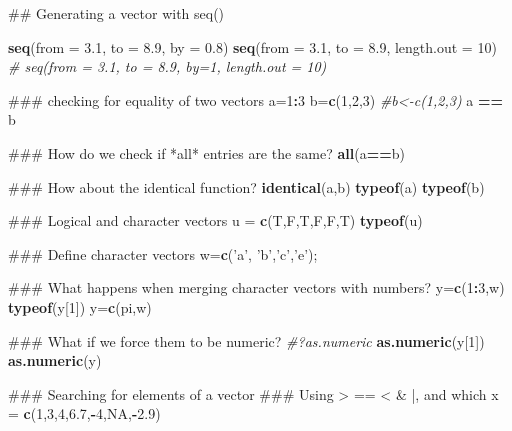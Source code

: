 \documentclass[12pt,]{book}
\newenvironment{Shaded}{\begin{snugshade}}{\end{snugshade}}
\newcommand{\KeywordTok}[1]{\textcolor[rgb]{0.13,0.29,0.53}{\textbf{#1}}}
\newcommand{\DataTypeTok}[1]{\textcolor[rgb]{0.13,0.29,0.53}{#1}}
\newcommand{\DecValTok}[1]{\textcolor[rgb]{0.00,0.00,0.81}{#1}}
\newcommand{\FloatTok}[1]{\textcolor[rgb]{0.00,0.00,0.81}{#1}}
\newcommand{\StringTok}[1]{\textcolor[rgb]{0.31,0.60,0.02}{#1}}
\newcommand{\CommentTok}[1]{\textcolor[rgb]{0.56,0.35,0.01}{\textit{#1}}}
\newcommand{\OtherTok}[1]{\textcolor[rgb]{0.56,0.35,0.01}{#1}}
\newcommand{\OperatorTok}[1]{\textcolor[rgb]{0.81,0.36,0.00}{\textbf{#1}}}
\newcommand{\NormalTok}[1]{#1}
\begin{document}
\begin{Shaded}
\begin{Highlighting}[]
\NormalTok{## Generating a vector with seq()}

\KeywordTok{seq}\NormalTok{(}\DataTypeTok{from =} \FloatTok{3.1}\NormalTok{, }\DataTypeTok{to =} \FloatTok{8.9}\NormalTok{, }\DataTypeTok{by =} \FloatTok{0.8}\NormalTok{)}
\KeywordTok{seq}\NormalTok{(}\DataTypeTok{from =} \FloatTok{3.1}\NormalTok{, }\DataTypeTok{to =} \FloatTok{8.9}\NormalTok{, }\DataTypeTok{length.out =} \DecValTok{10}\NormalTok{)}
\CommentTok{# seq(from = 3.1, to = 8.9, by=1, length.out = 10)}

\NormalTok{### checking for equality of two vectors}
\NormalTok{a=}\DecValTok{1}\OperatorTok{:}\DecValTok{3}
\NormalTok{b=}\KeywordTok{c}\NormalTok{(}\DecValTok{1}\NormalTok{,}\DecValTok{2}\NormalTok{,}\DecValTok{3}\NormalTok{) }\CommentTok{#b<-c(1,2,3)}
\NormalTok{a }\OperatorTok{==}\StringTok{ }\NormalTok{b}

\NormalTok{### How do we check if *all* entries are the same?}
\KeywordTok{all}\NormalTok{(a}\OperatorTok{==}\NormalTok{b)}

\NormalTok{### How about the identical function?}
\KeywordTok{identical}\NormalTok{(a,b)}
\KeywordTok{typeof}\NormalTok{(a)}
\KeywordTok{typeof}\NormalTok{(b)}

\NormalTok{### Logical and character vectors}
\NormalTok{u =}\StringTok{ }\KeywordTok{c}\NormalTok{(T,F,T,F,F,T)}
\KeywordTok{typeof}\NormalTok{(u)}

\NormalTok{### Define character vectors}
\NormalTok{w=}\KeywordTok{c}\NormalTok{(}\StringTok{'a'}\NormalTok{, }\StringTok{'b'}\NormalTok{,}\StringTok{'c'}\NormalTok{,}\StringTok{'e'}\NormalTok{);}

\NormalTok{### What happens when merging character vectors with numbers?}
\NormalTok{y=}\KeywordTok{c}\NormalTok{(}\DecValTok{1}\OperatorTok{:}\DecValTok{3}\NormalTok{,w)}
\KeywordTok{typeof}\NormalTok{(y[}\DecValTok{1}\NormalTok{])}
\NormalTok{y=}\KeywordTok{c}\NormalTok{(pi,w)}

\NormalTok{### What if we force them to be numeric?}
\CommentTok{#?as.numeric}
\KeywordTok{as.numeric}\NormalTok{(y[}\DecValTok{1}\NormalTok{])}
\KeywordTok{as.numeric}\NormalTok{(y)}

\NormalTok{### Searching for elements of a vector}
\NormalTok{### Using > == < & |, and which}
\NormalTok{x =}\StringTok{ }\KeywordTok{c}\NormalTok{(}\DecValTok{1}\NormalTok{,}\DecValTok{3}\NormalTok{,}\DecValTok{4}\NormalTok{,}\FloatTok{6.7}\NormalTok{,}\OperatorTok{-}\DecValTok{4}\NormalTok{,}\OtherTok{NA}\NormalTok{,}\OperatorTok{-}\FloatTok{2.9}\NormalTok{)}


\end{Highlighting}
\end{Shaded}
\end{document}
